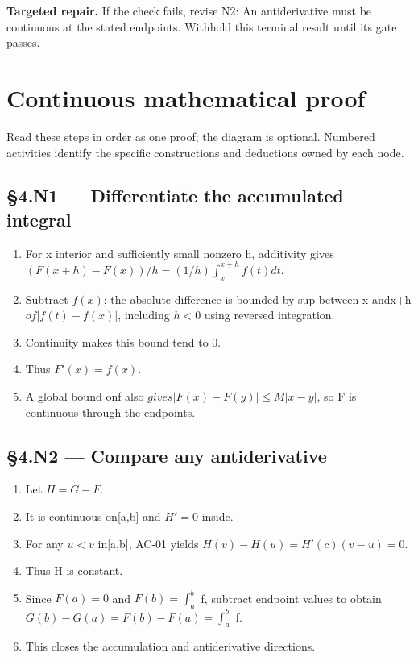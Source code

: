 \documentclass[preprint,12pt,aps,pra,showkeys,amsmath,amssymb,superscriptaddress,floatfix]{revtex4-2}
\theoremstyle{definition}
\theoremstyle{remark}
\newcommand{\field}[2]{\par\smallskip\noindent\textbf{#1.} #2\par}
\begin{document}
\field{Targeted repair}{If the check fails, revise N2: An antiderivative must be continuous at
the stated endpoints. Withhold this terminal result until its gate
passes.}

\endgroup\clearpage\section{Continuous mathematical proof}\label{sec:proof}

Read these steps in order as one proof; the diagram is optional.
Numbered activities identify the specific constructions and deductions
owned by each node.

\subsection{§4.N1 --- Differentiate the accumulated
integral}\label{n1-differentiate-the-accumulated-integral}

\begin{enumerate}
\def\labelenumi{\arabic{enumi}.}
\item
  For x interior and sufficiently small nonzero h, additivity gives
  \((F(x+h)-F(x))/h=(1/h)\int _x^{x+h}f(t)dt\).
\item
  Subtract \(f(x)\); the absolute difference is bounded by sup between x
  andx+h \(of|f(t)-f(x)|\), including \(h<0\) using reversed
  integration.
\item
  Continuity makes this bound tend to 0.
\item
  Thus \(F'(x)=f(x)\).
\item
  A global bound on\textbar f\textbar{} also
  \(gives|F(x)-F(y)|\le M|x-y|\), so F is continuous through the
  endpoints.
\end{enumerate}

\subsection{§4.N2 --- Compare any
antiderivative}\label{n2-compare-any-antiderivative}

\begin{enumerate}
\def\labelenumi{\arabic{enumi}.}
\item
  Let \(H=G-F\).
\item
  It is continuous on{[}a,b{]} and \(H'=0\) inside.
\item
  For any \(u<v\) in{[}a,b{]}, AC-01 yields \(H(v)-H(u)=H'(c)(v-u)=0\).
\item
  Thus H is constant.
\item
  Since \(F(a)=0\) and \(F(b)=\int _a^b\) f, subtract endpoint values to
  obtain \(G(b)-G(a)=F(b)-F(a)=\int _a^b\) f.
\item
  This closes the accumulation and antiderivative directions.
\end{enumerate}
\end{document}
